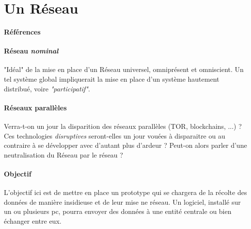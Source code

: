 \section{Un Réseau}
\paragraph{Références} \cite{DarkWeb0}

\paragraph{Réseau \emph{nominal}} "Idéal" de la mise en place d'un Réseau universel, omniprésent
et omniscient. Un tel système global impliquerait la mise en place d'un système hautement
distribué, voire \emph{"participatif"}.

\paragraph{Réseaux parallèles} Verra-t-on un jour la disparition des réseaux parallèles
(TOR, blockchains, ...) ? Ces technologies \emph{disruptives} seront-elles un jour vouées
à disparaitre ou au contraire à se développer avec d'autant plus d'ardeur ? Peut-on alors
parler d'une neutralisation du Réseau par le réseau ?

\paragraph{Objectif} L'objectif ici est de mettre en place un prototype qui se chargera de la récolte des données
de manière insidieuse et de leur mise ne réseau. Un logiciel, installé sur un ou plusieurs pc,
pourra envoyer des données à une entité centrale ou bien échanger entre eux.
